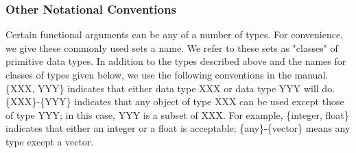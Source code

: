 \subsubsection{Other Notational Conventions}

Certain functional arguments can be any of a number of  types.
For  convenience,  we  give these commonly used sets a name.  We
refer to these sets as "classes" of primitive data  types.    In
addition  to the types described above and the names for classes
of types given below, we use the following  conventions  in  the
manual.   \{XXX, YYY\} indicates that either data type XXX or data
type YYY will do.  \{XXX\}-\{YYY\} indicates that any object of type
XXX can be used except those of type YYY; in this case, YYY is a
subset of XXX.  For example,  \{integer,  float\}  indicates  that
either an integer or a float is acceptable; \{any\}-\{vector\} means
any type except a vector.

